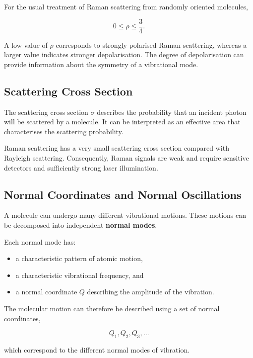 \documentclass[11pt,a4paper]{article}
\begin{document}
For the usual treatment of Raman scattering from randomly oriented molecules,

\begin{equation}
    0 \leq \rho \leq \frac{3}{4}.
\end{equation}

A low value of $\rho$ corresponds to strongly polarised Raman scattering, whereas
a larger value indicates stronger depolarisation. The degree of depolarisation can
provide information about the symmetry of a vibrational mode.


\subsection{Scattering Cross Section}

The scattering cross section $\sigma$ describes the probability that an incident
photon will be scattered by a molecule. It can be interpreted as an effective area
that characterises the scattering probability.

Raman scattering has a very small scattering cross section compared with Rayleigh
scattering. Consequently, Raman signals are weak and require sensitive detectors
and sufficiently strong laser illumination.


\subsection{Normal Coordinates and Normal Oscillations}

A molecule can undergo many different vibrational motions. These motions can be
decomposed into independent \textbf{normal modes}.

Each normal mode has:

\begin{itemize}
    \item a characteristic pattern of atomic motion,
    \item a characteristic vibrational frequency, and
    \item a normal coordinate $Q$ describing the amplitude of the vibration.
\end{itemize}

The molecular motion can therefore be described using a set of normal coordinates,

\begin{equation}
    Q_1,Q_2,Q_3,\ldots
\end{equation}

which correspond to the different normal modes of vibration.
\end{document}
